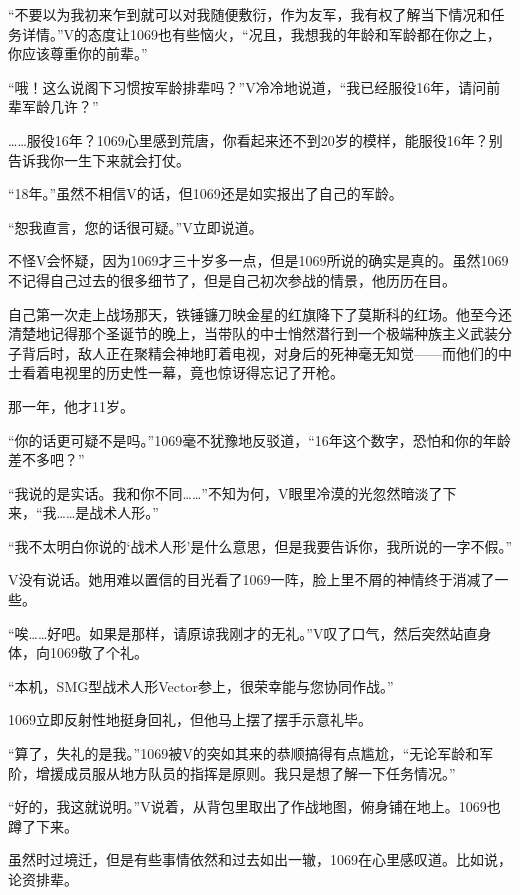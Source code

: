 “不要以为我初来乍到就可以对我随便敷衍，作为友军，我有权了解当下情况和任务详情。”V的态度让1069也有些恼火，“况且，我想我的年龄和军龄都在你之上，你应该尊重你的前辈。”

“哦！这么说阁下习惯按军龄排辈吗？”V冷冷地说道，“我已经服役16年，请问前辈军龄几许？”

……服役16年？1069心里感到荒唐，你看起来还不到20岁的模样，能服役16年？别告诉我你一生下来就会打仗。

“18年。”虽然不相信V的话，但1069还是如实报出了自己的军龄。

“恕我直言，您的话很可疑。”V立即说道。

不怪V会怀疑，因为1069才三十岁多一点，但是1069所说的确实是真的。虽然1069不记得自己过去的很多细节了，但是自己初次参战的情景，他历历在目。

自己第一次走上战场那天，铁锤镰刀映金星的红旗降下了莫斯科的红场。他至今还清楚地记得那个圣诞节的晚上，当带队的中士悄然潜行到一个极端种族主义武装分子背后时，敌人正在聚精会神地盯着电视，对身后的死神毫无知觉——而他们的中士看着电视里的历史性一幕，竟也惊讶得忘记了开枪。

那一年，他才11岁。

“你的话更可疑不是吗。”1069毫不犹豫地反驳道，“16年这个数字，恐怕和你的年龄差不多吧？”

“我说的是实话。我和你不同……”不知为何，V眼里冷漠的光忽然暗淡了下来，“我……是战术人形。”

“我不太明白你说的‘战术人形’是什么意思，但是我要告诉你，我所说的一字不假。”

V没有说话。她用难以置信的目光看了1069一阵，脸上里不屑的神情终于消减了一些。

“唉……好吧。如果是那样，请原谅我刚才的无礼。”V叹了口气，然后突然站直身体，向1069敬了个礼。

“本机，SMG型战术人形Vector参上，很荣幸能与您协同作战。”

1069立即反射性地挺身回礼，但他马上摆了摆手示意礼毕。

“算了，失礼的是我。”1069被V的突如其来的恭顺搞得有点尴尬，“无论军龄和军阶，增援成员服从地方队员的指挥是原则。我只是想了解一下任务情况。”

“好的，我这就说明。”V说着，从背包里取出了作战地图，俯身铺在地上。1069也蹲了下来。

虽然时过境迁，但是有些事情依然和过去如出一辙，1069在心里感叹道。比如说，论资排辈。

\section*{}


